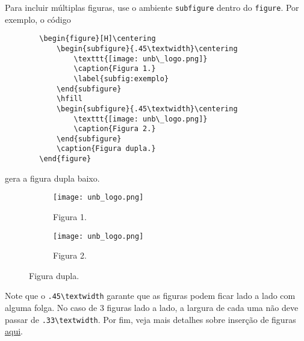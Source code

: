        Para incluir múltiplas figuras, use o ambiente {\tt subfigure} dentro do {\tt figure}.
        Por exemplo, o código
        \begin{verbatim}
        \begin{figure}[H]\centering
            \begin{subfigure}{.45\textwidth}\centering
                \texttt{[image: unb\_logo.png]}                
                \caption{Figura 1.}
                \label{subfig:exemplo}
            \end{subfigure}
            \hfill
            \begin{subfigure}{.45\textwidth}\centering
                \texttt{[image: unb\_logo.png]}                
                \caption{Figura 2.}
            \end{subfigure}
            \caption{Figura dupla.}
        \end{figure}
        \end{verbatim}

        gera a figura dupla baixo.
        \begin{figure}[H]\centering
            \begin{subfigure}{.45\textwidth}\centering
                \texttt{[image: unb\_logo.png]}                
                \caption{Figura 1.}
                \label{subfig:exemplo}
            \end{subfigure}
            \hfill
            \begin{subfigure}{.45\textwidth}\centering
                \texttt{[image: unb\_logo.png]}                
                \caption{Figura 2.}
            \end{subfigure}
            \caption{Figura dupla.}
        \end{figure}

        Note que o \verb|.45\textwidth| garante que as figuras podem ficar lado a lado com alguma folga. 
        No caso de 3 figuras lado a lado, a largura de cada uma não deve passar de \verb|.33\textwidth|.
        Por fim, veja mais detalhes sobre inserção de figuras 
        \href{https://www.overleaf.com/learn/latex/Inserting_Images}{aqui}.